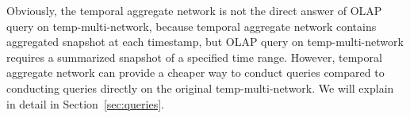 \documentclass[10pt,journal,compsoc]{IEEEtran}
\begin{document}


Obviously, the temporal aggregate network is not the direct answer of OLAP query on temp-multi-network, because temporal aggregate network contains aggregated snapshot at each timestamp, but OLAP query on temp-multi-network requires a summarized snapshot of a specified time range. However, temporal aggregate network can provide a cheaper way to conduct queries compared to conducting queries directly on the original temp-multi-network. We will explain in detail in Section~\ref{sec:queries}. %
\end{document}
